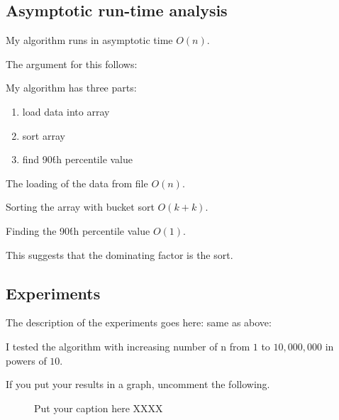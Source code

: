 \documentclass{article}
\begin{document}
\subsection{Asymptotic run-time analysis}

My algorithm runs in asymptotic time $O(n)$. 

The argument for this follows:

My algorithm has three parts:
\begin{enumerate}
	\item load data into array
	\item sort array
	\item find 90\'th percentile value
\end{enumerate}

The loading of the data from file $O(n)$.

Sorting the array with bucket sort $O(k + k)$.

Finding the 90\'th percentile value $O(1)$.

This suggests that the dominating factor is the sort.


\subsection{Experiments}
\label{sec:experiments2}
The description of the experiments goes here: same as above:

I tested the algorithm with increasing number of n from $1$ to $10,000,000$ 
in powers of $10$.

 If you put your results in a graph, uncomment the following. 

 \begin{figure}
   \centering
  
   \caption{Put your caption here XXXX}
   \label{fig:experiment1}
 \end{figure}
\end{document}
